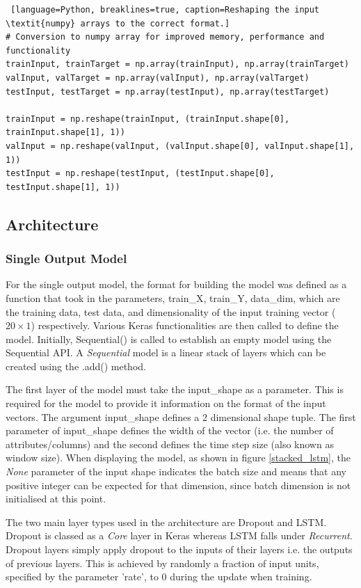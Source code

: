 \documentclass[10pt,onecolumn,letterpaper]{article}
\begin{document}
\begin{lstlisting} [language=Python, breaklines=true, caption=Reshaping the input \textit{numpy} arrays to the correct format.]
# Conversion to numpy array for improved memory, performance and functionality
trainInput, trainTarget = np.array(trainInput), np.array(trainTarget)
valInput, valTarget = np.array(valInput), np.array(valTarget)
testInput, testTarget = np.array(testInput), np.array(testTarget)

trainInput = np.reshape(trainInput, (trainInput.shape[0], trainInput.shape[1], 1))
valInput = np.reshape(valInput, (valInput.shape[0], valInput.shape[1], 1))
testInput = np.reshape(testInput, (testInput.shape[0], testInput.shape[1], 1))
\end{lstlisting} 

\subsection{Architecture} 
\subsubsection{Single Output Model}

For the single output model, the format for building the model was defined as a function that took in the parameters, train\_X, train\_Y, data\_dim, which are the training data, test data, and dimensionality of the input training vector ($20\times1$) respectively. Various Keras functionalities are then called to define the model. Initially, Sequential() is called to establish an empty model using the Sequential API. A \textit{Sequential} model is a linear stack of layers which can be created using the .add() method. 

The first layer of the model must take the input\_shape as a parameter. This is required for the model to provide it information on the format of the input vectors. The argument input\_shape defines a 2 dimensional shape tuple. The first parameter of input\_shape defines the width of the vector (i.e. the number of attributes/columns) and the second defines the time step size (also known as window size). When displaying the model, as shown in figure \ref{stacked_lstm}, the \textit{None} parameter of the input shape indicates the batch size and means that any positive integer can be expected for that dimension, since batch dimension is not initialised at this point. 

The two main layer types used in the architecture are Dropout and LSTM. Dropout is classed as a \textit{Core} layer in Keras whereas LSTM falls under \textit{Recurrent}. Dropout layers simply apply dropout to the inputs of their layers i.e. the outputs of previous layers. This is achieved by randomly a fraction of input units, specified by the parameter 'rate', to 0 during the update when training. 
\end{document}
